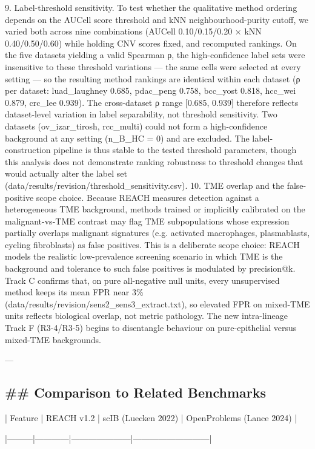 \documentclass[11pt]{article}
\newcommand{\added}[1]{{\color{trackred}#1}}
\begin{document}
\added{9. Label-threshold sensitivity. To test whether the qualitative method ordering depends on the AUCell score threshold and kNN neighbourhood-purity cutoff, we varied both across nine combinations (AUCell 0.10/0.15/0.20 × kNN 0.40/0.50/0.60) while holding CNV scores fixed, and recomputed rankings. On the five datasets yielding a valid Spearman ρ, the high-confidence label sets were insensitive to these threshold variations — the same cells were selected at every setting — so the resulting method rankings are identical within each dataset (ρ per dataset: luad\_laughney 0.685, pdac\_peng 0.758, bcc\_yost 0.818, hcc\_wei 0.879, crc\_lee 0.939). The cross-dataset ρ range [0.685, 0.939] therefore reflects dataset-level variation in label separability, not threshold sensitivity. Two datasets (ov\_izar\_tirosh, rcc\_multi) could not form a high-confidence background at any setting (n\_B\_HC = 0) and are excluded. The label-construction pipeline is thus stable to the tested threshold parameters, though this analysis does not demonstrate ranking robustness to threshold changes that would actually alter the label set (data/results/revision/threshold\_sensitivity.csv).
10. TME overlap and the false-positive scope choice. Because REACH measures detection against a heterogeneous TME background, methods trained or implicitly calibrated on the malignant-vs-TME contrast may flag TME subpopulations whose expression partially overlaps malignant signatures (e.g. activated macrophages, plasmablasts, cycling fibroblasts) as false positives. This is a deliberate scope choice: REACH models the realistic low-prevalence screening scenario in which TME is the background and tolerance to such false positives is modulated by precision@k. Track C confirms that, on pure all-negative null units, every unsupervised method keeps its mean FPR near 3\% (data/results/revision/sens2\_sens3\_extract.txt), so elevated FPR on mixed-TME units reflects biological overlap, not metric pathology. The new intra-lineage Track F (R3-4/R3-5) begins to disentangle behaviour on pure-epithelial versus mixed-TME backgrounds.}

---

\subsection*{\#\# Comparison to Related Benchmarks}
| Feature | REACH v1.2 | scIB (Luecken 2022) | OpenProblems (Lance 2024) |

|---------|------------|---------------------|---------------------------|
\end{document}
